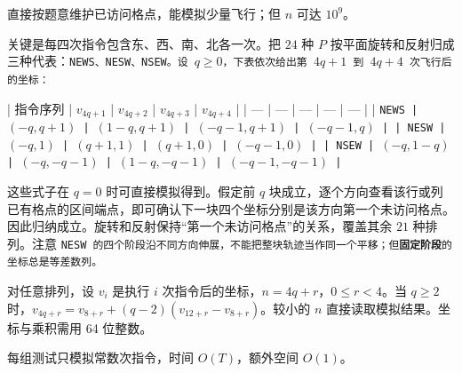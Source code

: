 \Legend
直接按题意维护已访问格点，能模拟少量飞行；但 $n$ 可达 $10^9$。

关键是每四次指令包含东、西、南、北各一次。把 $24$ 种 $P$ 按平面旋转和反射归成三种代表：\tt{NEWS}、\tt{NESW}、\tt{NSEW}。设 $q\ge0$，下表依次给出第 $4q+1$ 到 $4q+4$ 次飞行后的坐标：

| 指令序列 | $v_{4q+1}$ | $v_{4q+2}$ | $v_{4q+3}$ | $v_{4q+4}$ |
| --- | --- | --- | --- | --- |
| \tt{NEWS} | $(-q,q+1)$ | $(1-q,q+1)$ | $(-q-1,q+1)$ | $(-q-1,q)$ |
| \tt{NESW} | $(-q,1)$ | $(q+1,1)$ | $(q+1,0)$ | $(-q-1,0)$ |
| \tt{NSEW} | $(-q,1-q)$ | $(-q,-q-1)$ | $(1-q,-q-1)$ | $(-q-1,-q-1)$ |

这些式子在 $q=0$ 时可直接模拟得到。假定前 $q$ 块成立，逐个方向查看该行或列已有格点的区间端点，即可确认下一块四个坐标分别是该方向第一个未访问格点。因此归纳成立。旋转和反射保持“第一个未访问格点”的关系，覆盖其余 $21$ 种排列。注意 \tt{NESW} 的四个阶段沿不同方向伸展，不能把整块轨迹当作同一个平移；但\textbf{固定阶段}的坐标总是等差数列。

对任意排列，设 $v_i$ 是执行 $i$ 次指令后的坐标，$n=4q+r$，$0\le r<4$。当 $q\ge2$ 时，$v_{4q+r}=v_{8+r}+(q-2)(v_{12+r}-v_{8+r})$。较小的 $n$ 直接读取模拟结果。坐标与乘积需用 64 位整数。

每组测试只模拟常数次指令，时间 $O(T)$，额外空间 $O(1)$。
